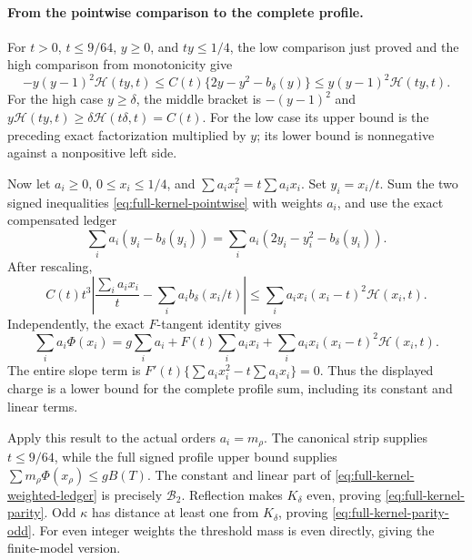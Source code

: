 \paragraph{From the pointwise comparison to the complete profile.}
For \(t>0\), \(t\le9/64\), \(y\ge0\), and \(ty\le1/4\), the low
comparison just proved and the high comparison from monotonicity give
\begin{equation}
 -y(y-1)^2\mathcal H(ty,t)
 \le C(t)\{2y-y^2-b_\delta(y)\}
 \le y(y-1)^2\mathcal H(ty,t).
 \label{eq:full-kernel-pointwise}
\end{equation}
For the high case \(y\ge\delta\), the middle bracket is
\(-(y-1)^2\) and
\(y\mathcal H(ty,t)\ge\delta\mathcal H(t\delta,t)=C(t)\).
For the low case its upper bound is the preceding exact
factorization multiplied by \(y\); its lower bound is nonnegative
against a nonpositive left side.

Now let \(a_i\ge0\), \(0\le x_i\le1/4\), and
\(\sum a_i x_i^2=t\sum a_i x_i\).
Set \(y_i=x_i/t\).  Sum the two signed inequalities
\eqref{eq:full-kernel-pointwise} with weights \(a_i\), and use the exact
compensated ledger
\[
 \sum_i a_i(y_i-b_\delta(y_i))
   =\sum_i a_i(2y_i-y_i^2-b_\delta(y_i)).
\]
After rescaling,
\[
 C(t)t^3\left|\frac{\sum_i a_ix_i}{t}
             -\sum_i a_i b_\delta(x_i/t)\right|
 \le\sum_i a_ix_i(x_i-t)^2\mathcal H(x_i,t).
\]
Independently, the exact \(F\)-tangent identity gives
\begin{equation}
 \sum_i a_i\Phi(x_i)
   =g\sum_i a_i+F(t)\sum_i a_ix_i
      +\sum_i a_ix_i(x_i-t)^2\mathcal H(x_i,t).
 \label{eq:full-kernel-weighted-ledger}
\end{equation}
The entire slope term is
\(F'(t)\{\sum a_ix_i^2-t\sum a_ix_i\}=0\).
Thus the displayed charge is a lower bound for the complete profile
sum, including its constant and linear terms.

Apply this result to the actual orders \(a_i=m_\rho\).
The canonical strip supplies \(t\le9/64\), while the full signed
profile upper bound supplies \(\sum m_\rho\Phi(x_\rho)\le gB(T)\).
The constant and linear part of
\eqref{eq:full-kernel-weighted-ledger} is precisely \(\mathcal B_2\).
Reflection makes \(K_\delta\) even, proving
\eqref{eq:full-kernel-parity}.  Odd \(\kappa\) has distance at least
one from \(K_\delta\), proving \eqref{eq:full-kernel-parity-odd}.
For even integer weights the threshold mass is even directly, giving
the finite-model version.

